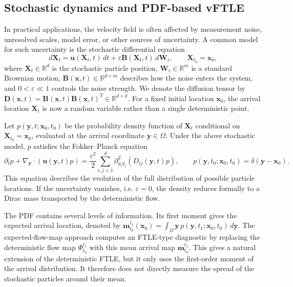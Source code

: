 \documentclass[a4paper,11pt]{article}
\numberwithin{equation}{section}
\theoremstyle{plain}
\theoremstyle{definition}
\theoremstyle{remark}
\newcommand{\R}{\mathbb{R}}
\newcommand{\bx}{\mathbf{x}}
\newcommand{\by}{\mathbf{y}}
\newcommand{\bu}{\mathbf{u}}
\newcommand{\bX}{\mathbf{X}}
\newcommand{\bW}{\mathbf{W}}
\newcommand{\bB}{\mathbf{B}}
\newcommand{\bD}{\mathbf{D}}
\newcommand{\mean}{\mathbf{m}}
\begin{document}
\subsection{Stochastic dynamics and PDF-based vFTLE}

In practical applications, the velocity field is often affected by measurement noise, unresolved scales, model error, or other sources of uncertainty.  A common model for such uncertainty is the stochastic differential equation
\begin{equation}
    d\bX_t=\bu(\bX_t,t)\,dt+\varepsilon\bB(\bX_t,t)\,d\bW_t,
    \qquad \bX_{t_0}=\bx_0,
    \label{eq:sde}
\end{equation}
where \(\bX_t\in\R^d\) is the stochastic particle position, \(\bW_t\in\R^m\) is a standard Brownian motion, \(\bB(\bx,t)\in\R^{d\times m}\) describes how the noise enters the system, and \(0<\varepsilon\ll 1\) controls the noise strength.  We denote the diffusion tensor by \(\bD(\bx,t)=\bB(\bx,t)\bB(\bx,t)^T\in\R^{d\times d}\).  For a fixed initial location \(\bx_0\), the arrival location \(\bX_t\) is now a random variable rather than a single deterministic point.

Let \(p(\by,t;\bx_0,t_0)\) be the probability density function of \(\bX_t\) conditional on \(\bX_{t_0}=\bx_0\), evaluated at the arrival coordinate \(\by\in\Omega\).  Under the above stochastic model, \(p\) satisfies the Fokker--Planck equation
\begin{equation}
    \partial_t p+\nabla_{\by}\cdot(\bu(\by,t)p)
    =
    \frac{\varepsilon^2}{2}\sum_{i,j=1}^d
    \partial_{y_i y_j}^2\!\left(D_{ij}(\by,t)p\right),
    \qquad
    p(\by,t_0;\bx_0,t_0)=\delta(\by-\bx_0).
    \label{eq:fp}
\end{equation}
This equation describes the evolution of the full distribution of possible particle locations.  If the uncertainty vanishes, i.e. \(\varepsilon=0\), the density reduces formally to a Dirac mass transported by the deterministic flow.

The PDF contains several levels of information.  Its first moment gives the expected arrival location, denoted by \(\mean_{t_0}^{t_1}(\bx_0)=\int_\Omega \by\,p(\by,t_1;\bx_0,t_0)\,d\by\).  The expected-flow-map approach computes an FTLE-type diagnostic by replacing the deterministic flow map \(\Phi_{t_0}^{t_1}\) with this mean arrival map \(\mean_{t_0}^{t_1}\).  This gives a natural extension of the deterministic FTLE, but it only uses the first-order moment of the arrival distribution.  It therefore does not directly measure the spread of the stochastic particles around their mean.
\end{document}
